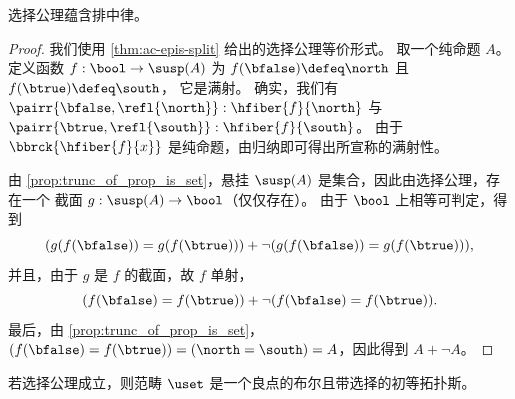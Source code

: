 \begin{thm}[Diaconescu]\label{thm:1surj_to_surj_to_pem}
  选择公理蕴含排中律。
\end{thm}

\begin{proof}
我们使用 \cref{thm:ac-epis-split} 给出的选择公理等价形式。
取一个纯命题 $A$。
定义函数 $f:\bool\to\susp(A)$ 为
$f(\bfalse) \defeq \north$ 且 $f(\btrue) \defeq \south$，
它是满射。
确实，我们有
$\pairr{\bfalse,\refl{\north}} : \hfiber{f}{\north}$
与 $\pairr{\btrue,\refl{\south}} :\hfiber{f}{\south}$。
由于 $\bbrck{\hfiber{f}{x}}$ 是纯命题，由归纳即可得出所宣称的满射性。

由 \cref{prop:trunc_of_prop_is_set}，悬挂 $\susp(A)$
是集合，因此由选择公理，存在一个
截面 $g: \susp(A) \to \bool$（仅仅存在）。
由于 $\bool$ 上相等可判定，得到
\begin{equation*}
 (g(f(\bfalse))= g(f(\btrue))) +
 \lnot (g(f(\bfalse))= g(f(\btrue))),
\end{equation*}
并且，由于 $g$ 是 $f$ 的截面，故 $f$ 单射，
\begin{equation*}
(f(\bfalse) = f(\btrue)) +
\lnot (f(\bfalse) = f(\btrue)).
\end{equation*}
最后，由 \cref{prop:trunc_of_prop_is_set}，$(f(\bfalse)=f(\btrue)) = (\north=\south) = A$，因此得到 $A+\neg A$。
\end{proof}




\begin{thm}\label{thm:ETCS}
  若选择公理成立，则范畴 $\uset$ 是一个良点的布尔且带选择的初等拓扑斯。
\end{thm}

